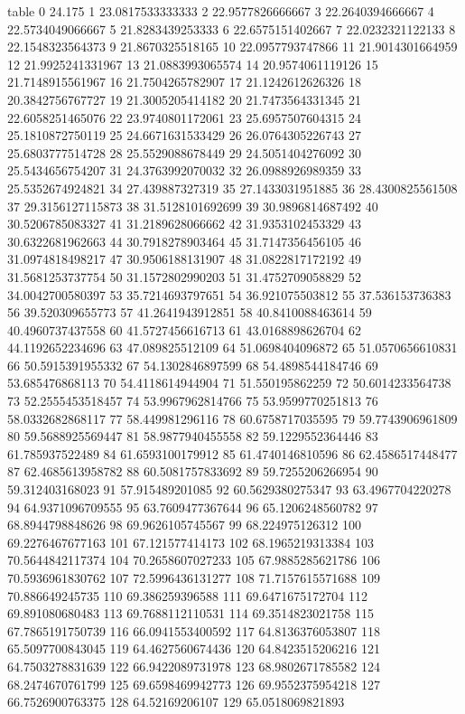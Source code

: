 table {%
0 24.175
1 23.0817533333333
2 22.9577826666667
3 22.2640394666667
4 22.5734049066667
5 21.8283439253333
6 22.6575151402667
7 22.0232321122133
8 22.1548323564373
9 21.8670325518165
10 22.0957793747866
11 21.9014301664959
12 21.9925241331967
13 21.0883993065574
14 20.9574061119126
15 21.7148915561967
16 21.7504265782907
17 21.1242612626326
18 20.3842756767727
19 21.3005205414182
20 21.7473564331345
21 22.6058251465076
22 23.9740801172061
23 25.6957507604315
24 25.1810872750119
25 24.6671631533429
26 26.0764305226743
27 25.6803777514728
28 25.5529088678449
29 24.5051404276092
30 25.5434656754207
31 24.3763992070032
32 26.0988926989359
33 25.5352674924821
34 27.439887327319
35 27.1433031951885
36 28.4300825561508
37 29.3156127115873
38 31.5128101692699
39 30.9896814687492
40 30.5206785083327
41 31.2189628066662
42 31.9353102453329
43 30.6322681962663
44 30.7918278903464
45 31.7147356456105
46 31.0974818498217
47 30.9506188131907
48 31.0822817172192
49 31.5681253737754
50 31.1572802990203
51 31.4752709058829
52 34.0042700580397
53 35.7214693797651
54 36.921075503812
55 37.536153736383
56 39.520309655773
57 41.2641943912851
58 40.8410088463614
59 40.4960737437558
60 41.5727456616713
61 43.0168898626704
62 44.1192652234696
63 47.089825512109
64 51.0698404096872
65 51.0570656610831
66 50.5915391955332
67 54.1302846897599
68 54.4898544184746
69 53.685476868113
70 54.4118614944904
71 51.550195862259
72 50.6014233564738
73 52.2555453518457
74 53.9967962814766
75 53.9599770251813
76 58.0332682868117
77 58.449981296116
78 60.6758717035595
79 59.7743906961809
80 59.5688925569447
81 58.9877940455558
82 59.1229552364446
83 61.785937522489
84 61.6593100179912
85 61.4740146810596
86 62.4586517448477
87 62.4685613958782
88 60.5081757833692
89 59.7255206266954
90 59.312403168023
91 57.915489201085
92 60.5629380275347
93 63.4967704220278
94 64.9371096709555
95 63.7609477367644
96 65.1206248560782
97 68.8944798848626
98 69.9626105745567
99 68.224975126312
100 69.2276467677163
101 67.121577414173
102 68.1965219313384
103 70.5644842117374
104 70.2658607027233
105 67.9885285621786
106 70.5936961830762
107 72.5996436131277
108 71.7157615571688
109 70.886649245735
110 69.386259396588
111 69.6471675172704
112 69.891080680483
113 69.7688112110531
114 69.3514823021758
115 67.7865191750739
116 66.0941553400592
117 64.8136376053807
118 65.5097700843045
119 64.4627560674436
120 64.8423515206216
121 64.7503278831639
122 66.9422089731978
123 68.9802671785582
124 68.2474670761799
125 69.6598469942773
126 69.9552375954218
127 66.7526900763375
128 64.52169206107
129 65.0518069821893
}
